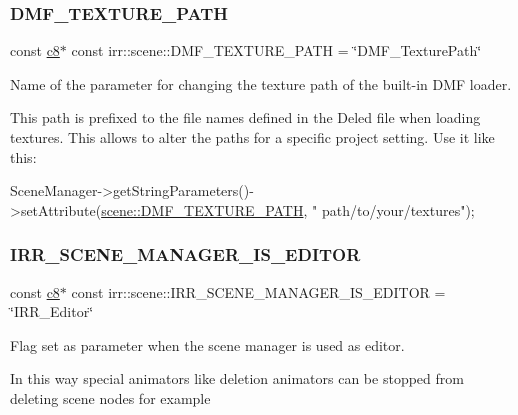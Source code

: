 \subsubsection{\texorpdfstring{D\+M\+F\+\_\+\+T\+E\+X\+T\+U\+R\+E\+\_\+\+P\+A\+TH}{DMF\_TEXTURE\_PATH}}
{\footnotesize\ttfamily const \hyperlink{namespaceirr_a9395eaea339bcb546b319e9c96bf7410}{c8}$\ast$ const irr\+::scene\+::\+D\+M\+F\+\_\+\+T\+E\+X\+T\+U\+R\+E\+\_\+\+P\+A\+TH = \char`\"{}D\+M\+F\+\_\+\+Texture\+Path\char`\"{}}



Name of the parameter for changing the texture path of the built-\/in D\+MF loader. 

This path is prefixed to the file names defined in the Deled file when loading textures. This allows to alter the paths for a specific project setting. Use it like this\+: 
\begin{DoxyCode}
SceneManager->getStringParameters()->setAttribute(\hyperlink{namespaceirr_1_1scene_a2a6e8bd33eaec1815e3e16a59c269fb5}{scene::DMF\_TEXTURE\_PATH}, \textcolor{stringliteral}{"
      path/to/your/textures"});
\end{DoxyCode}
 \mbox{\label{namespaceirr_1_1scene_a7a3f4a75d85bd2b3f6bc4dd58f3ce585}} 
\subsubsection{\texorpdfstring{I\+R\+R\+\_\+\+S\+C\+E\+N\+E\+\_\+\+M\+A\+N\+A\+G\+E\+R\+\_\+\+I\+S\+\_\+\+E\+D\+I\+T\+OR}{IRR\_SCENE\_MANAGER\_IS\_EDITOR}}
{\footnotesize\ttfamily const \hyperlink{namespaceirr_a9395eaea339bcb546b319e9c96bf7410}{c8}$\ast$ const irr\+::scene\+::\+I\+R\+R\+\_\+\+S\+C\+E\+N\+E\+\_\+\+M\+A\+N\+A\+G\+E\+R\+\_\+\+I\+S\+\_\+\+E\+D\+I\+T\+OR = \char`\"{}I\+R\+R\+\_\+\+Editor\char`\"{}}



Flag set as parameter when the scene manager is used as editor. 

In this way special animators like deletion animators can be stopped from deleting scene nodes for example \mbox{\label{namespaceirr_1_1scene_a1d81a2ac8866dfa4a0ff3bdece327f75}} 
